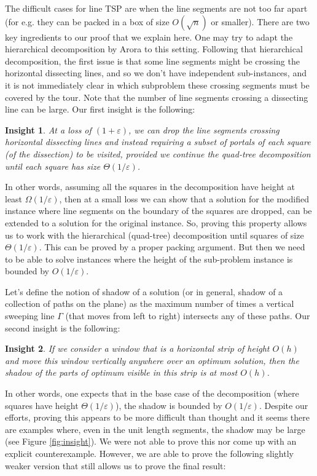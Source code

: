 \documentclass[10pt,a4paper]{amsart}
\theoremstyle{thmstyleone}
\newtheorem{insight}{Insight}
\newcommand{\eps}{\varepsilon}
\begin{document}
The difficult cases for line TSP are when the line segments are not too far apart (for e.g. they  can be packed in a box
of size $O(\sqrt{n})$ or smaller). There are two key ingredients to our proof that we explain here.
One may try to adapt the hierarchical decomposition by Arora \cite{Arora98} 
to this setting. Following that hierarchical decomposition,
the first issue is that some line segments might be crossing the horizontal dissecting lines, and so we don't have independent sub-instances, and it is not immediately clear in which subproblem these crossing segments must be covered by the tour. Note that 
the number of line segments crossing a dissecting line can be large.
Our first insight is the following:

\begin{insight}
    At a loss of $(1+\eps)$, we can drop the line segments crossing horizontal dissecting lines and instead requiring a subset of portals of each square (of the dissection) to be visited, provided 
    we continue the quad-tree decomposition until each square has size $\Theta(1/\eps)$.
\end{insight}

In other words, assuming all the squares in the decomposition have height at least $\Omega(1/\eps)$, then at a small loss we can show that a solution for the modified instance where line segments on the boundary of the squares are dropped, can be extended to a solution for the original instance. So, proving this property  allows us to work with the hierarchical (quad-tree) decomposition until squares of size $\Theta(1/\eps)$. This can be proved by a proper packing argument. But then we need to be able to solve instances where the height of the sub-problem instance is bounded by $O(1/\eps)$.

Let's define the notion of shadow of a solution (or in general, shadow of a collection of paths on the plane) as the maximum number of times a vertical sweeping line $\Gamma$ (that moves from left to right) intersects any of these paths. Our second insight is the following:

\begin{insight}
    If we consider a window that is a horizontal strip of height $O(h)$ and move this window 
    vertically anywhere over an optimum solution, then the shadow of the parts of optimum visible in this strip is at most $O(h)$.
\end{insight}

In other words, one expects that in the base case of the decomposition (where squares have height $\Theta(1/\eps)$), the shadow is bounded by $O(1/\eps)$. Despite our efforts, proving this appears to be more difficult than thought and it seems there are examples where, even in the unit length segments, the shadow may be large (see Figure \ref{fig:insight}). We were not able to prove this nor come up with an explicit counterexample.
However, we are able to prove the following slightly weaker version that still allows us to prove the final result:
\end{document}
